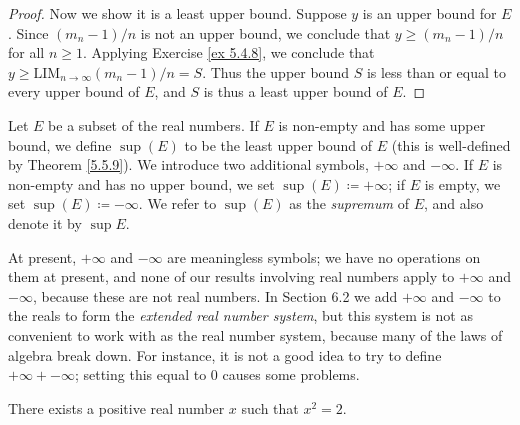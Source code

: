 \begin{proof}
Now we show it is a least upper bound.
Suppose \(y\) is an upper bound for \(E\).
Since \((m_n - 1) / n\) is not an upper bound, we conclude that \(y \geq (m_n - 1) / n\) for all \(n \geq 1\).
Applying Exercise \ref{ex 5.4.8}, we conclude that \(y \geq \text{LIM}_{n \to \infty} (m_n - 1) / n = S\).
Thus the upper bound \(S\) is less than or equal to every upper bound of \(E\), and \(S\) is thus a least upper bound of \(E\).
\end{proof}

\begin{definition}[Supremum]\label{5.5.10}
Let \(E\) be a subset of the real numbers.
If \(E\) is non-empty and has some upper bound, we define \(\sup(E)\) to be the least upper bound of \(E\)
(this is well-defined by Theorem \ref{5.5.9}).
We introduce two additional symbols, \(+\infty\) and \(-\infty\).
If \(E\) is non-empty and has no upper bound, we set \(\sup(E) \coloneqq +\infty\);
if \(E\) is empty, we set \(\sup(E) \coloneqq -\infty\).
We refer to \(\sup(E)\) as the \emph{supremum} of \(E\), and also denote it by \(\sup E\).
\end{definition}

\begin{remark}\label{5.5.11}
At present, \(+\infty\) and \(-\infty\) are meaningless symbols;
we have no operations on them at present, and none of our results involving real numbers apply to \(+\infty\) and \(-\infty\), because these are not real numbers.
In Section 6.2 we add \(+\infty\) and \(-\infty\) to the reals to form the \emph{extended real number system}, but this system is not as convenient to work with as the real number system, because many of the laws of algebra break down.
For instance, it is not a good idea to try to define \(+\infty + -\infty\);
setting this equal to \(0\) causes some problems.
\end{remark}

\begin{proposition}\label{5.5.12}
There exists a positive real number \(x\) such that \(x^2 = 2\).
\end{proposition}

